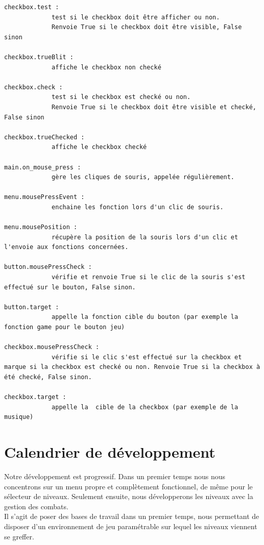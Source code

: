 \documentclass{article}
\begin{document}
\begin{verbatim}
checkbox.test :
             test si le checkbox doit être afficher ou non.
             Renvoie True si le checkbox doit être visible, False sinon

checkbox.trueBlit :
             affiche le checkbox non checké

checkbox.check :
             test si le checkbox est checké ou non.   
             Renvoie True si le checkbox doit être visible et checké, False sinon

checkbox.trueChecked :
             affiche le checkbox checké

main.on_mouse_press :
             gère les cliques de souris, appelée régulièrement.

menu.mousePressEvent :
             enchaine les fonction lors d'un clic de souris.

menu.mousePosition :
             récupère la position de la souris lors d'un clic et l'envoie aux fonctions concernées.

button.mousePressCheck :
             vérifie et renvoie True si le clic de la souris s'est effectué sur le bouton, False sinon.

button.target :
             appelle la fonction cible du bouton (par exemple la fonction game pour le bouton jeu)

checkbox.mousePressCheck :
             vérifie si le clic s'est effectué sur la checkbox et marque si la checkbox est checké ou non. Renvoie True si la checkbox à été checké, False sinon.

checkbox.target :
             appelle la  cible de la checkbox (par exemple de la musique)

\end{verbatim}

 

\newpage
\section{Calendrier de développement}
Notre développement est progressif. Dans un premier temps nous nous concentrons sur un menu propre et complètement fonctionnel, de même pour le sélecteur de niveaux. Seulement ensuite, nous développerons les niveaux avec la gestion des combats.\\
	
Il s'agit de poser des bases de travail dans un premier temps, nous permettant de disposer d'un environnement de jeu paramétrable sur lequel les niveaux viennent se greffer.
\end{document}
